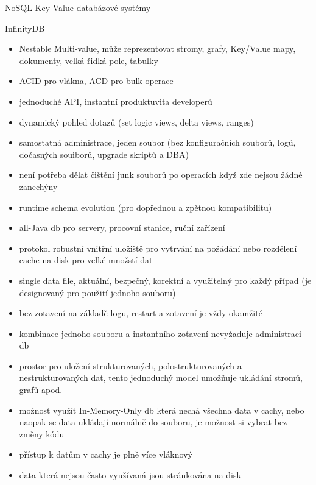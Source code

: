 \documentclass{article}
\begin{document}
\begin{section}{NoSQL Key Value databázové systémy}
		\begin{subsection}{InfinityDB}
			\begin{itemize}
				\item Nestable Multi-value, může reprezentovat stromy, grafy, Key/Value mapy, dokumenty, velká řidká pole, tabulky
				\item ACID pro vlákna, ACD pro bulk operace
				\item jednoduché API, instantní produktuvita developerů
				\item dynamický pohled dotazů (set logic views, delta views, ranges)
				\item samostatná administrace, jeden soubor (bez konfiguračních souborů, logů, dočasných souiborů, upgrade skriptů a DBA)
				\item není potřeba dělat čištění junk souborů po operacích když zde nejsou žádné zanechýny
				\item runtime schema evolution (pro dopřednou a zpětnou kompatibilitu)
				\item all-Java db pro servery, procovní stanice, ruční zařízení
				\item protokol robustní vnitřní uložiště pro vytrvání na požádání nebo rozdělení cache na disk pro velké množstí dat
				\item single data file, aktuální, bezpečný, korektní a využitelný pro každý případ (je designovaný pro použití jednoho souboru)
				\item bez zotavení na základě logu, restart a zotavení je vždy okamžité
				\item kombinace jednoho souboru a instantního zotavení nevyžaduje administraci db
				\item prostor pro uložení strukturovaných, polostrukturovaných a nestrukturovaných dat, tento jednoduchý model umožňuje ukládání stromů, grafů apod.
				\item možnost využít In-Memory-Only db která nechá všechna data v cachy, nebo naopak se data ukládají normálně do souboru, je možnost si vybrat bez změny kódu
				\item přístup k datům v cachy je plně více vláknový
				\item data která nejsou často využívaná jsou stránkována na disk
			\end{itemize}
		\end{subsection}
		

\end{section}
\end{document}
